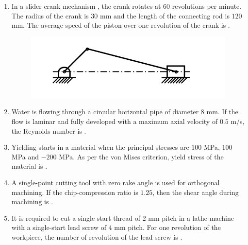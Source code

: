 \documentclass[journal,12pt,onecolumn]{IEEEtran}
\theoremstyle{remark}
\begin{document}
\begin{enumerate}
    \hfill{}

    \item In a slider crank mechanism , the crank rotates at $60$ revolutions per minute. The radius of the crank is $30$ mm and the length of the connecting rod is $120$ mm. The average speed  of the piston over one revolution of the crank is \underline{\hspace{2cm}}.
    \begin{figure}[H]
        \centering
        \includegraphics[width=0.6\columnwidth]{q26.png}
        \caption*{}
        \label{fig:q26}
    \end{figure}

    \hfill{}

    \item Water  is flowing through a circular horizontal pipe of diameter $8$ mm. If the flow is laminar and fully developed with a maximum axial velocity of $0.5$ m/s, the Reynolds number is \underline{\hspace{2cm}}.

    \hfill{}

    \item Yielding starts in a material when the principal stresses are $100$ MPa, $100$ MPa and $-200$ MPa. As per the von Mises criterion, yield stress  of the material is \underline{\hspace{2cm}}.

    \hfill{}

    \item A single-point cutting tool with zero rake angle is used for orthogonal machining. If the chip-compression ratio is $1.25$, then the shear angle  during machining is \underline{\hspace{2cm}}.

    \hfill{}

    \item It is required to cut a single-start thread of $2$ mm pitch in a lathe machine with a single-start lead screw of $4$ mm pitch. For one revolution of the workpiece, the number of revolution of the lead screw is \underline{\hspace{2cm}}.


\end{enumerate}
\end{document}
